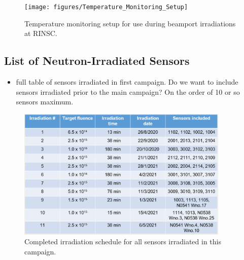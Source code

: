 \begin{figure}[!hbt]
  \begin{center}
    \texttt{[image: figures/Temperature\_Monitoring\_Setup]}
    \caption{Temperature monitoring setup for use during beamport irradiations at RINSC.}
    \label{fig:Temperature_Monitoring_Setup}
  \end{center}
\end{figure}

\subsection{List of Neutron-Irradiated Sensors}
\begin{itemize}
  \item full table of sensors irradiated in first campaign. Do we want to include sensors irradiated prior to the main campaign? On the order of 10 or so sensors maximum.
\end{itemize}

\begin{figure}[!hbt]
  \begin{center}
    \includegraphics[width=0.90\textwidth]{figures/Completed_Irradiation_Schedule_at_RINSC}
    \caption{Completed irradiation schedule for all sensors irradiated in this campaign.}
    \label{fig:Irradiation_Schedule}
  \end{center}
\end{figure}

\label{subsec:sensors_irradiation}
